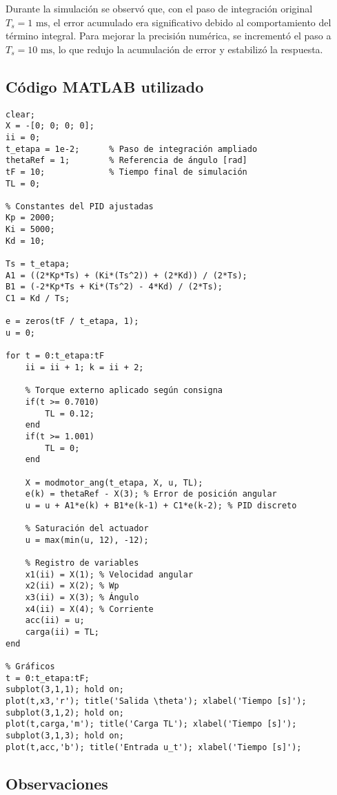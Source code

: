 \documentclass{article}
\begin{document}
Durante la simulación se observó que, con el paso de integración original $T_s = 1\text{ ms}$, el error acumulado era significativo debido al comportamiento del término integral. Para mejorar la precisión numérica, se incrementó el paso a $T_s = 10\text{ ms}$, lo que redujo la acumulación de error y estabilizó la respuesta.

\subsection*{Código MATLAB utilizado}

\begin{verbatim}
clear;
X = -[0; 0; 0; 0];
ii = 0;
t_etapa = 1e-2;      % Paso de integración ampliado
thetaRef = 1;        % Referencia de ángulo [rad]
tF = 10;             % Tiempo final de simulación
TL = 0;

% Constantes del PID ajustadas
Kp = 2000;
Ki = 5000;
Kd = 10;

Ts = t_etapa;
A1 = ((2*Kp*Ts) + (Ki*(Ts^2)) + (2*Kd)) / (2*Ts);
B1 = (-2*Kp*Ts + Ki*(Ts^2) - 4*Kd) / (2*Ts);
C1 = Kd / Ts;

e = zeros(tF / t_etapa, 1); 
u = 0;

for t = 0:t_etapa:tF
    ii = ii + 1; k = ii + 2;

    % Torque externo aplicado según consigna
    if(t >= 0.7010)
        TL = 0.12;
    end
    if(t >= 1.001)
        TL = 0;
    end

    X = modmotor_ang(t_etapa, X, u, TL);
    e(k) = thetaRef - X(3); % Error de posición angular
    u = u + A1*e(k) + B1*e(k-1) + C1*e(k-2); % PID discreto

    % Saturación del actuador
    u = max(min(u, 12), -12); 

    % Registro de variables
    x1(ii) = X(1); % Velocidad angular
    x2(ii) = X(2); % Wp
    x3(ii) = X(3); % Ángulo
    x4(ii) = X(4); % Corriente
    acc(ii) = u;
    carga(ii) = TL;
end

% Gráficos
t = 0:t_etapa:tF;
subplot(3,1,1); hold on;
plot(t,x3,'r'); title('Salida \theta'); xlabel('Tiempo [s]');
subplot(3,1,2); hold on;
plot(t,carga,'m'); title('Carga TL'); xlabel('Tiempo [s]');
subplot(3,1,3); hold on;
plot(t,acc,'b'); title('Entrada u_t'); xlabel('Tiempo [s]');
\end{verbatim}

\subsection*{Observaciones}
\end{document}
